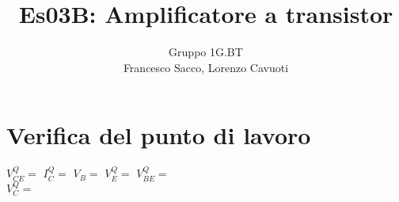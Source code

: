 \documentclass[10pt,a4paper]{article}
\author{Gruppo 1G.BT \\ Francesco Sacco, Lorenzo Cavuoti}
\title{Es03B: Amplificatore a transistor}
\begin{document}
	\maketitle
	\section{Verifica del punto di lavoro}
	
	$V_{CE}^Q = $
	$I_{C}^Q = $
	$V_{B} = $
	$V_{E}^Q = $
	$V_{BE}^Q = $\\
	$V_{C}^Q = $
	
		
\end{document}
